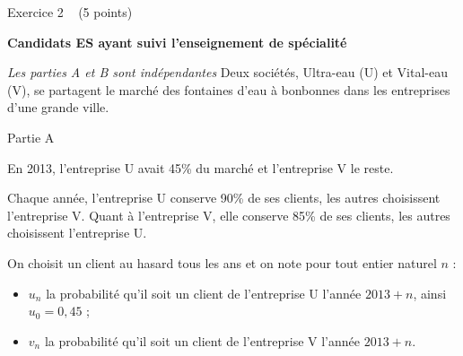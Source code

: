 
%
\begin{h2}Exercice 2   (5 points)\end{h2}
\textbf{Candidats ES ayant  suivi l'enseignement de spécialité}
\par
\textit{Les parties A et B sont indépendantes}
Deux sociétés, Ultra-eau (U) et Vital-eau (V), se partagent le marché des fontaines d'eau à bonbonnes dans les entreprises d'une grande ville.
\begin{h3}Partie A\end{h3}
En 2013, l'entreprise U avait 45\% du marché et l'entreprise V le reste.
\par
Chaque année, l'entreprise U conserve 90\% de ses clients, les autres choisissent l'entreprise V. Quant à l'entreprise V, elle conserve 85\% de ses clients, les autres choisissent l'entreprise U.
\par
On choisit un client au hasard tous les ans et on note pour tout entier naturel $n$ :
\begin{itemize}
     \item
     $u_{n}$ la probabilité qu'il soit un client de l'entreprise U l'année $2013+n$, ainsi $u_{0}=0,45$ ;
     \item
     $v_{n}$ la probabilité qu'il soit un client de l'entreprise V l'année $2013+n$.
\end{itemize}
